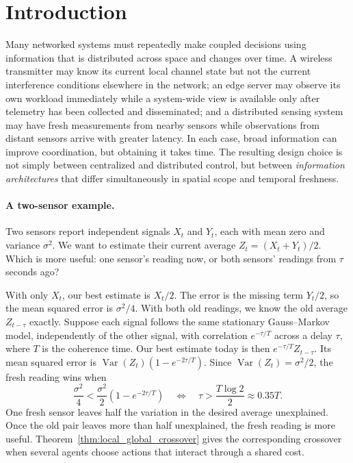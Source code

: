 \documentclass[11pt]{article}
\begin{document}
\section{Introduction}
\label{sec:introduction}

Many networked systems must repeatedly make coupled decisions using information
that is distributed across space and changes over time. A wireless transmitter
may know its current local channel state but not the current interference
conditions elsewhere in the network; an edge server may observe its own
workload immediately while a system-wide view is available only after telemetry
has been collected and disseminated; and a distributed sensing system may have
fresh measurements from nearby sensors while observations from distant sensors
arrive with greater latency. In each case, broad information can improve
coordination, but obtaining it takes time. The resulting design choice is not
simply between centralized and distributed control, but between
\emph{information architectures} that differ simultaneously in spatial scope
and temporal freshness.

\paragraph*{A two-sensor example.}
Two sensors report independent signals $X_t$ and $Y_t$, each with mean zero
and variance $\sigma^2$. We want to estimate their current average
$Z_t=(X_t+Y_t)/2$. Which is more useful: one sensor's reading now, or both
sensors' readings from $\tau$ seconds ago?

With only $X_t$, our best estimate is $X_t/2$. The error is the missing term
$Y_t/2$, so the mean squared error is $\sigma^2/4$. With both old readings,
we know the old average $Z_{t-\tau}$ exactly. Suppose each signal follows
the same stationary Gauss--Markov model, independently of the other signal,
with correlation $e^{-\tau/T}$ across a delay $\tau$, where $T$ is the
coherence time. Our best estimate today is then $e^{-\tau/T}Z_{t-\tau}$.
Its mean squared error is
$\operatorname{Var}(Z_t)(1-e^{-2\tau/T})$. Since
$\operatorname{Var}(Z_t)=\sigma^2/2$, the fresh reading wins when
\[
    \frac{\sigma^2}{4}
    <\frac{\sigma^2}{2}(1-e^{-2\tau/T})
    \quad\Longleftrightarrow\quad
    \tau>\frac{T\log 2}{2}\approx 0.35T.
\]
One fresh sensor leaves half the variation in the desired average
unexplained. Once the old pair leaves more than half unexplained, the fresh
reading is more useful. Theorem~\ref{thm:local_global_crossover} gives the
corresponding crossover when several agents choose actions that interact
through a shared cost.
\end{document}
